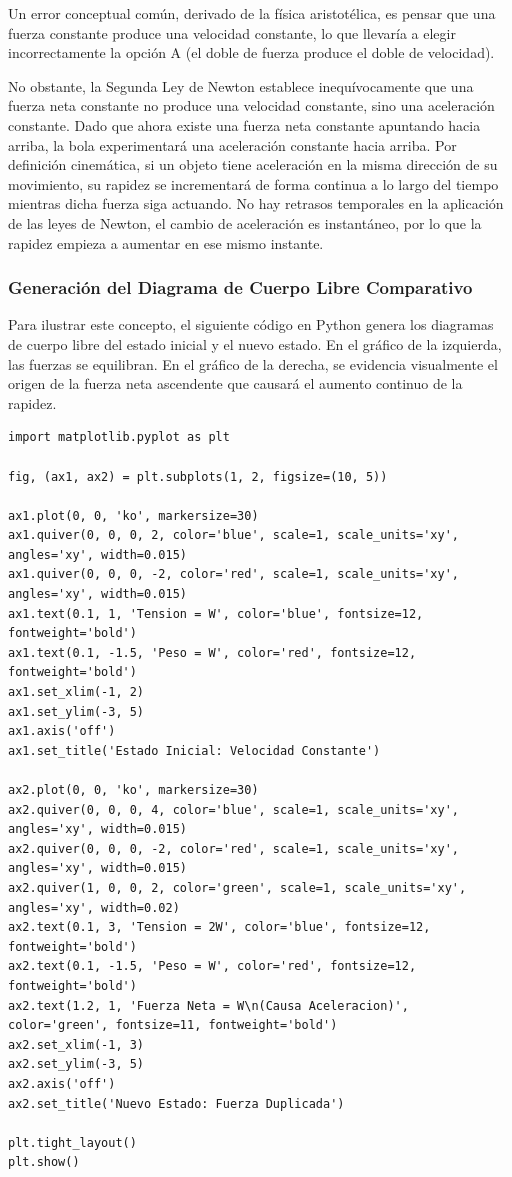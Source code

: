 \documentclass[12pt, a4paper]{article}
\begin{document}
Un error conceptual común, derivado de la física aristotélica, es pensar que una fuerza constante produce una velocidad constante, lo que llevaría a elegir incorrectamente la opción A (el doble de fuerza produce el doble de velocidad). 

No obstante, la Segunda Ley de Newton establece inequívocamente que una fuerza neta constante no produce una velocidad constante, sino una aceleración constante. Dado que ahora existe una fuerza neta constante apuntando hacia arriba, la bola experimentará una aceleración constante hacia arriba. Por definición cinemática, si un objeto tiene aceleración en la misma dirección de su movimiento, su rapidez se incrementará de forma continua a lo largo del tiempo mientras dicha fuerza siga actuando. No hay retrasos temporales en la aplicación de las leyes de Newton, el cambio de aceleración es instantáneo, por lo que la rapidez empieza a aumentar en ese mismo instante.

\subsubsection*{Generación del Diagrama de Cuerpo Libre Comparativo}

Para ilustrar este concepto, el siguiente código en Python genera los diagramas de cuerpo libre del estado inicial y el nuevo estado. En el gráfico de la izquierda, las fuerzas se equilibran. En el gráfico de la derecha, se evidencia visualmente el origen de la fuerza neta ascendente que causará el aumento continuo de la rapidez.

\begin{lstlisting}
import matplotlib.pyplot as plt

fig, (ax1, ax2) = plt.subplots(1, 2, figsize=(10, 5))

ax1.plot(0, 0, 'ko', markersize=30)
ax1.quiver(0, 0, 0, 2, color='blue', scale=1, scale_units='xy', angles='xy', width=0.015)
ax1.quiver(0, 0, 0, -2, color='red', scale=1, scale_units='xy', angles='xy', width=0.015)
ax1.text(0.1, 1, 'Tension = W', color='blue', fontsize=12, fontweight='bold')
ax1.text(0.1, -1.5, 'Peso = W', color='red', fontsize=12, fontweight='bold')
ax1.set_xlim(-1, 2)
ax1.set_ylim(-3, 5)
ax1.axis('off')
ax1.set_title('Estado Inicial: Velocidad Constante')

ax2.plot(0, 0, 'ko', markersize=30)
ax2.quiver(0, 0, 0, 4, color='blue', scale=1, scale_units='xy', angles='xy', width=0.015)
ax2.quiver(0, 0, 0, -2, color='red', scale=1, scale_units='xy', angles='xy', width=0.015)
ax2.quiver(1, 0, 0, 2, color='green', scale=1, scale_units='xy', angles='xy', width=0.02)
ax2.text(0.1, 3, 'Tension = 2W', color='blue', fontsize=12, fontweight='bold')
ax2.text(0.1, -1.5, 'Peso = W', color='red', fontsize=12, fontweight='bold')
ax2.text(1.2, 1, 'Fuerza Neta = W\n(Causa Aceleracion)', color='green', fontsize=11, fontweight='bold')
ax2.set_xlim(-1, 3)
ax2.set_ylim(-3, 5)
ax2.axis('off')
ax2.set_title('Nuevo Estado: Fuerza Duplicada')

plt.tight_layout()
plt.show()
\end{lstlisting}
\end{document}
